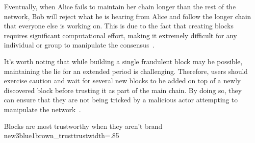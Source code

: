 Eventually, when Alice fails to maintain her chain longer than the rest of the network, Bob will reject what he is hearing from Alice
and follow the longer chain that everyone else is working on. This is due to the fact that creating blocks requires significant computational
effort, making it extremely difficult for any individual or group to manipulate the consensus~\cite{szabo2005bit}.

It's worth noting that while building a single fraudulent block may be possible, maintaining the lie for an extended period is
challenging. Therefore, users should exercise caution and wait for several new blocks to be added on top of a newly discovered
block before trusting it as part of the main chain. By doing so, they can ensure that they are not being tricked by a malicious
actor attempting to manipulate the network~\cite{dupont2019cryptocurrencies}.

{Blocks are most trustworthy when they aren't brand new}{3blue1brown_trust}{trust}{width=.85\textwidth}%
